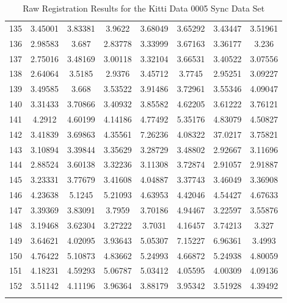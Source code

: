 \begin{center}
\begin{longtable}{cccccccc}
135 & 3.45001 & 3.83381 & 3.9622 & 3.68049 & 3.65292 & 3.43447 & 3.51961\\
136 & 2.98583 & 3.687 & 2.83778 & 3.33999 & 3.67163 & 3.36177 & 3.236\\
137 & 2.75016 & 3.48169 & 3.00118 & 3.32104 & 3.66531 & 3.40522 & 3.07556\\
138 & 2.64064 & 3.5185 & 2.9376 & 3.45712 & 3.7745 & 2.95251 & 3.09227\\
139 & 3.49585 & 3.668 & 3.53522 & 3.91486 & 3.72961 & 3.55346 & 4.09047\\
140 & 3.31433 & 3.70866 & 3.40932 & 3.85582 & 4.62205 & 3.61222 & 3.76121\\
141 & 4.2912 & 4.60199 & 4.14186 & 4.77492 & 5.35176 & 4.83079 & 4.50827\\
142 & 3.41839 & 3.69863 & 4.35561 & 7.26236 & 4.08322 & 37.0217 & 3.75821\\
143 & 3.10894 & 3.39844 & 3.35629 & 3.28729 & 3.48802 & 2.92667 & 3.11696\\
144 & 2.88524 & 3.60138 & 3.32236 & 3.11308 & 3.72874 & 2.91057 & 2.91887\\
145 & 3.23331 & 3.77679 & 3.41608 & 4.04887 & 3.37743 & 3.46049 & 3.36908\\
146 & 4.23638 & 5.1245 & 5.21093 & 4.63953 & 4.42046 & 4.54427 & 4.67633\\
147 & 3.39369 & 3.83091 & 3.7959 & 3.70186 & 4.94467 & 3.22597 & 3.55876\\
148 & 3.19468 & 3.62304 & 3.27222 & 3.7031 & 4.16457 & 3.74213 & 3.327\\
149 & 3.64621 & 4.02095 & 3.93643 & 5.05307 & 7.15227 & 6.96361 & 3.4993\\
150 & 4.76422 & 5.10873 & 4.83662 & 5.24993 & 4.66872 & 5.24938 & 4.80059\\
151 & 4.18231 & 4.59293 & 5.06787 & 5.03412 & 4.05595 & 4.00309 & 4.09136\\
152 & 3.51142 & 4.11196 & 3.96364 & 3.88179 & 3.95342 & 3.51928 & 4.39492\\
\caption{Raw Registration Results for the Kitti Data 0005 Sync Data Set}
\label{tab:kittidata0005syncFULL}
\end{longtable}
\end{center} 


